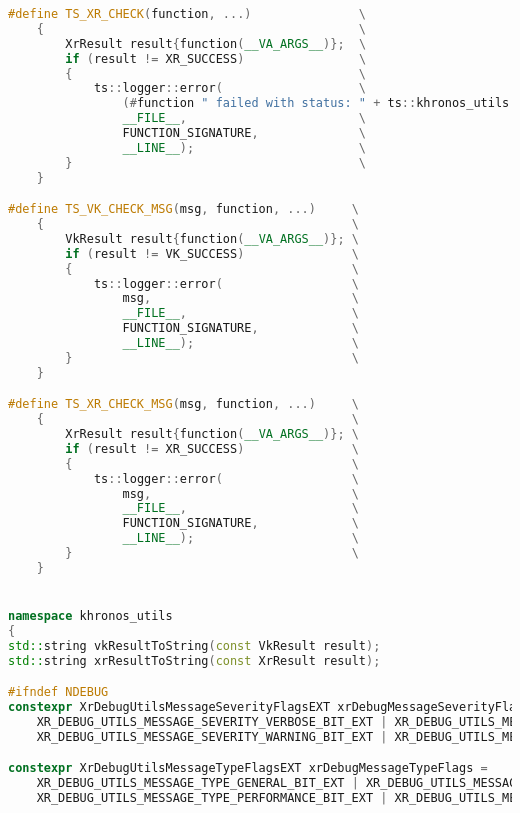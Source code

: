 \begin{itemize}
\begin{lstlisting}[language=c++, caption=Khronos Utils (./engine/src/khronos\_utils.h)]
#define TS_XR_CHECK(function, ...)               \
    {                                            \
        XrResult result{function(__VA_ARGS__)};  \
        if (result != XR_SUCCESS)                \
        {                                        \
            ts::logger::error(                   \
                (#function " failed with status: " + ts::khronos_utils::xrResultToString(result)).c_str(), \
                __FILE__,                        \
                FUNCTION_SIGNATURE,              \
                __LINE__);                       \
        }                                        \
    }

#define TS_VK_CHECK_MSG(msg, function, ...)     \
    {                                           \
        VkResult result{function(__VA_ARGS__)}; \
        if (result != VK_SUCCESS)               \
        {                                       \
            ts::logger::error(                  \
                msg,                            \
                __FILE__,                       \
                FUNCTION_SIGNATURE,             \
                __LINE__);                      \
        }                                       \
    }

#define TS_XR_CHECK_MSG(msg, function, ...)     \
    {                                           \
        XrResult result{function(__VA_ARGS__)}; \
        if (result != XR_SUCCESS)               \
        {                                       \
            ts::logger::error(                  \
                msg,                            \
                __FILE__,                       \
                FUNCTION_SIGNATURE,             \
                __LINE__);                      \
        }                                       \
    }


namespace khronos_utils
{
std::string vkResultToString(const VkResult result);
std::string xrResultToString(const XrResult result);

#ifndef NDEBUG
constexpr XrDebugUtilsMessageSeverityFlagsEXT xrDebugMessageSeverityFlags =
    XR_DEBUG_UTILS_MESSAGE_SEVERITY_VERBOSE_BIT_EXT | XR_DEBUG_UTILS_MESSAGE_SEVERITY_INFO_BIT_EXT |
    XR_DEBUG_UTILS_MESSAGE_SEVERITY_WARNING_BIT_EXT | XR_DEBUG_UTILS_MESSAGE_SEVERITY_ERROR_BIT_EXT;

constexpr XrDebugUtilsMessageTypeFlagsEXT xrDebugMessageTypeFlags =
    XR_DEBUG_UTILS_MESSAGE_TYPE_GENERAL_BIT_EXT | XR_DEBUG_UTILS_MESSAGE_TYPE_VALIDATION_BIT_EXT |
    XR_DEBUG_UTILS_MESSAGE_TYPE_PERFORMANCE_BIT_EXT | XR_DEBUG_UTILS_MESSAGE_TYPE_CONFORMANCE_BIT_EXT;


\end{lstlisting}
\end{itemize}
